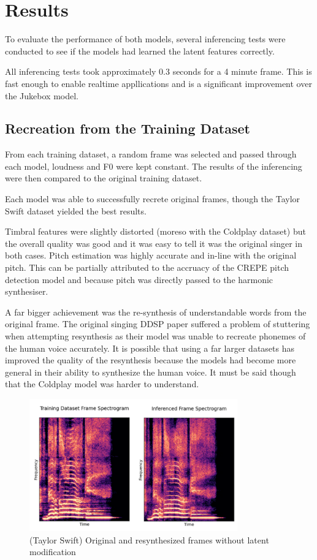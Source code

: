 \section{Results}

To evaluate the performance of both models, several inferencing tests were conducted to see if the models had learned the latent features correctly.

All inferencing tests took approximately 0.3 seconds for a 4 minute frame. This is fast enough to enable realtime appllications and is a significant improvement over the Jukebox model.

\subsection{Recreation from the Training Dataset}

From each training dataset, a random frame was selected and passed through each model, loudness and F0 were kept constant. The results of the inferencing were then compared to the original training dataset.

Each model was able to successfully recrete original frames, though the Taylor Swift dataset yielded the best results.

Timbral features were slightly distorted (moreso with the Coldplay dataset) but the overall quality was good and it was easy to tell it was the original singer in both cases. Pitch estimation was highly accurate and in-line with the original pitch. This can be partially attributed to the accruacy of the CREPE pitch detection model\cite{CREPE} and because pitch was directly passed to the harmonic synthesiser.

A far bigger achievement was the re-synthesis of understandable words from the original frame. The original singing DDSP paper\cite{SingingDDSP} suffered a problem of stuttering when attempting resynthesis as their model was unable to recreate phonemes of the human voice accurately. It is possible that using a far larger datasets has improved the quality of the resynthesis because the models had become more general in their ability to synthesize the human voice. It must be said though that the Coldplay model was harder to understand.

\begin{figure}[H]
    \centering
    \includegraphics[width=0.8\textwidth]{research/results/TaylorSwift/InferredRecreation.png}
    \caption{(Taylor Swift) Original and resynthesized frames without latent modification}
\end{figure}

